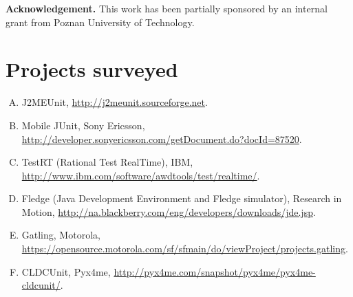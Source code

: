\documentclass{llncs}
\begin{document}

\bigskip\noindent\small\textbf{Acknowledgement.}
This work has been partially sponsored by an internal grant  from Poznan University of Technology.

\normalsize\raggedright



\section*{Projects surveyed}%
\small
\begin{enumerate}[A.]
    \item \label{j2meunit}%
          J2MEUnit, \url{http://j2meunit.sourceforge.net}.
	\item \label{mobilejunit}%
          Mobile JUnit, Sony Ericsson, \url{http://developer.sonyericsson.com/getDocument.do?docId=87520}.
	\item \label{rational}%
		  TestRT (Rational Test RealTime), IBM, \url{http://www.ibm.com/software/awdtools/test/realtime/}.
	\item \label{bbfledge}%
          Fledge (Java Development Environment and Fledge simulator), Research in Motion,
		  \url{http://na.blackberry.com/eng/developers/downloads/jde.jsp}.
	\item \label{gatling}%
		  Gatling, Motorola, \url{https://opensource.motorola.com/sf/sfmain/do/viewProject/projects.gatling}.
	\item \label{cldcunit}%
		  CLDCUnit, Pyx4me, \url{http://pyx4me.com/snapshot/pyx4me/pyx4me-cldcunit/}.
\end{enumerate}
\end{document}
